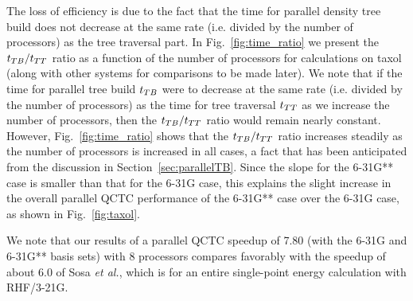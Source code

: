 \commentoutA{\documentclass[prl,aps,twocolumn,twocolumngrid,superbib]{revtex4}}
\begin{document}
The loss of efficiency is due to the fact that the time for parallel
density tree build does not decrease at the same rate (i.e.  divided
by the number of processors) as the tree traversal part.  In
Fig.~\ref{fig:time_ratio} we present the $t_{TB}/t_{TT}$ ratio as a
function of the number of processors for calculations on taxol (along
with other systems for comparisons to be made later).  We note that if
the time for parallel tree build $t_{TB}$ were to decrease at the same
rate (i.e. divided by the number of processors) as the time for tree
traversal $t_{TT}$ as we increase the number of processors, then the
$t_{TB}/t_{TT}$ ratio would remain nearly constant.  However,
Fig.~\ref{fig:time_ratio} shows that the $t_{TB}/t_{TT}$ ratio increases
steadily as the number of processors is increased in all cases, a fact
that has been anticipated from the discussion in
Section~\ref{sec:parallelTB}.  Since the slope for the 6-31G** case is
smaller than that for the 6-31G case, this explains the slight
increase in the overall parallel QCTC performance of the 6-31G** case
over the 6-31G case, as shown in Fig.~\ref{fig:taxol}.

We note that our results of a parallel QCTC
speedup of 7.80 (with the 6-31G and 6-31G** basis sets) with 8
processors compares favorably with the speedup of about 6.0 of Sosa
{\it et al.}\cite{Sosa_00v26}, which is for an entire single-point
energy calculation with RHF/3-21G.

\end{document}
